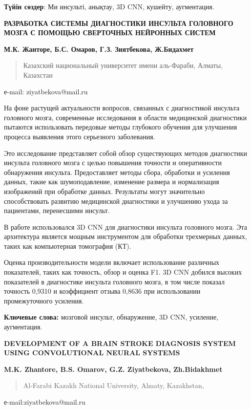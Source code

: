 \textbf{Түйін сөздер}: Ми инсульті, анықтау, 3D CNN, кушейту,
аугментация.

\textbf{РАЗРАБОТКА СИСТЕМЫ ДИАГНОСТИКИ ИНСУЛЬТА ГОЛОВНОГО МОЗГА С
ПОМОЩЬЮ СВЕРТОЧНЫХ НЕЙРОННЫХ СИСТЕМ}

\textbf{М.К. Жанторе, Б.С. Омаров, Г.З. Зиятбекова, Ж.Бидахмет}

\begin{quote}
Казахский национальный университет имени аль-Фараби, Алматы, Казахстан
\end{quote}

е-mail: ziyatbekova@mail.ru

На фоне растущей актуальности вопросов, связанных с диагностикой
инсульта головного мозга, современные исследования в области медицинской
диагностики пытаются использовать передовые методы глубокого обучения
для улучшения процесса выявления этого серьезного заболевания.

Это исследование представляет собой обзор существующих методов
диагностики инсульта головного мозга с целью повышения точности и
оперативности обнаружения инсульта. Предоставляет методы сбора,
обработки и усиления данных, такие как шумоподавление, изменение размера
и нормализация изображений при обработке данных. Результаты могут
значительно способствовать развитию медицинской диагностики и улучшению
ухода за пациентами, перенесшими инсульт.

В работе использовался 3D CNN для диагностики инсульта головного мозга.
Эта архитектура является мощным инструментом для обработки трехмерных
данных, таких как компьютерная томография (КТ).

Оценка производительности модели включает использование различных
показателей, таких как точность, обзор и оценка F1. 3D CNN добился
высоких показателей в диагностике инсульта головного мозга, в том числе
показал точность 0,9310 и коэффициент отзыва 0,8636 при использовании
промежуточного усиления.

\textbf{Ключевые слова:} мозговой инсульт, обнаружение, 3D CNN,
усиление, аугментация.

\textbf{DEVELOPMENT OF A BRAIN STROKE DIAGNOSIS SYSTEM USING
CONVOLUTIONAL NEURAL SYSTEMS}

\textbf{M.K. Zhantore, B.S. Omarov, G.Z. Ziyatbekova, Zh.Bidakhmet}

\begin{quote}
Al-Farabi Kazakh National University, Almaty, Kazakhstan,
\end{quote}

е-mail:ziyatbekova@mail.ru

